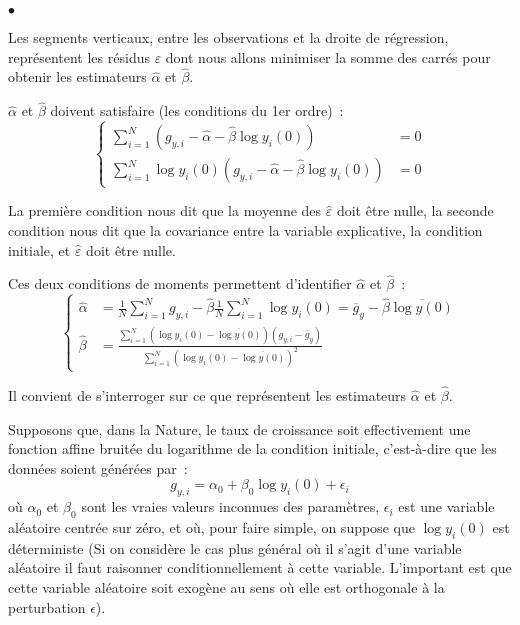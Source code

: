 \documentclass[10pt,notheorems]{beamer}
\theoremstyle{plain}
\theoremstyle{definition} %
\begin{document}
\begin{notes}
\begin{list}{$\bullet$}{}
      \medskip

    \item Les segments verticaux, entre les observations et la droite de régression, représentent les résidus $\varepsilon$ dont nous allons minimiser la somme des carrés pour obtenir les estimateurs $\hat\alpha$ et $\hat\beta$.\newline

    \item $\hat\alpha$ et $\hat\beta$ doivent satisfaire (les conditions du 1er ordre)~:
      \[
        \begin{cases}
          \sum_{i=1}^N \left(g_{y,i} - \hat\alpha - \hat\beta \log y_i(0)\right) &= 0\\
          \sum_{i=1}^N \log y_i(0)\left(g_{y,i} - \hat\alpha - \hat\beta \log y_i(0)\right) &= 0
        \end{cases}
      \]

    \item La première condition nous dit que la moyenne des $\hat\varepsilon$ doit être nulle, la seconde condition nous dit que la covariance entre la variable explicative, la condition initiale, et $\hat\varepsilon$ doit être nulle.\newline

    \item Ces deux conditions de moments permettent d'identifier $\hat\alpha$ et $\hat\beta$~:
      \[
        \begin{cases}
          \hat\alpha &= \frac{1}{N} \sum_{i=1}^Ng_{y,i} - \hat\beta \frac{1}{N} \sum_{i=1}^N \log y_i(0) = \overline{g}_{y} - \hat\beta \overline{\log y(0)}\\[12pt]
          \hat\beta &= \frac{\sum_{i=1}^N\left(\log y_i(0)-\overline{\log y(0)}\right)\left(g_{y,i}-\overline{g}_{y}\right)}{\sum_{i=1}^N\left(\log y_i(0)-\overline{\log y(0)}\right)^2}
        \end{cases}
      \]

    \item Il convient de s'interroger sur ce que représentent les estimateurs $\hat\alpha$ et $\hat\beta$.

    \item Supposons que, dans la Nature, le taux de croissance soit
      effectivement une fonction affine bruitée du logarithme de la condition initiale,
      c'est-à-dire que les données soient générées par~:
      \[
        g_{y,i} = \alpha_0 + \beta_0 \log y_i(0) + \epsilon_i
      \]
      où $\alpha_0$ et $\beta_0$ sont les vraies valeurs inconnues des
      paramètres, $\epsilon_i$ est une variable aléatoire centrée sur zéro, et
      où, pour faire simple, on suppose que $\log y_i(0)$ est déterministe (Si
      on considère le cas plus général où il s'agit d'une variable aléatoire il
      faut raisonner conditionnellement à cette variable. L'important est que
      cette variable aléatoire soit exogène au sens où elle est orthogonale à la
      perturbation $\epsilon$).\newline


\end{list}
\end{notes}
\end{document}
